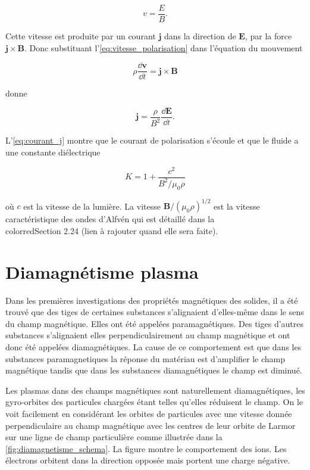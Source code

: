 \documentclass[main.tex]{subfiles}
\begin{document}
\begin{equation}
	v = \frac{E}{B}.
	\label{eq:vitesse_polarisation}
\end{equation}

\noindent Cette vitesse est produite par un courant \( \bm{j} \) dans la direction de \( \bm{E} \), par la force \( \bm{j} \times \bm{B} \).
Donc substituant l'\autoref{eq:vitesse_polarisation} dans l'équation du mouvement

\[
	\rho \frac{\dd \bm{v}}{\dd t} = \bm{j} \times \bm{B}
\]

\noindent donne

\begin{equation}
	\bm{j} = \frac{\rho}{B^2} \frac{\dd \bm{E}}{\dd t}.
	\label{eq:courant_j}
\end{equation}

L'\autoref{eq:courant_j} montre que le courant de polarisation s'écoule et que le fluide a une constante diélectrique

\[
	K = 1 + \frac{c^2}{B^2 / \mu_0 \rho}
\]

\noindent où \( c \) est la vitesse de la lumière.
La vitesse \( \bm{B} / \left( \mu_0 \rho \right)^{1/2} \) est la vitesse caractéristique des ondes d'Alfvén qui est détaillé dans la \\color{red}{Section 2.24 (lien à rajouter quand elle sera faite)}\color{black}.

\FloatBarrier
\section{Diamagnétisme plasma}

Dans les premières investigations des propriétés magnétiques des solides, il a été trouvé que des tiges de certaines substances s'alignaient d'elles-même dans le sens du champ magnétique.
Elles ont été appelées paramagnétiques.
Des tiges d'autres substances s'alignaient elles perpendiculairement au champ magnétique et ont donc été appelées diamagnétiques.
La cause de ce comportement est que dans les substances paramagnetiques la réponse du matériau est d'amplifier le champ magnétique tandis que dans les substances diamagnétiques le champ est diminué.

Les plasmas dans des champs magnétiques sont naturellement diamagnétiques, les gyro-orbites des particules chargées étant telles qu'elles réduisent le champ.
On le voit facilement en considérant les orbites de particules avec une vitesse donnée perpendiculaire au champ magnétique avec les centres de leur orbite de Larmor sur une ligne de champ particulière comme illustrée dans la \autoref{fig:diamagnetisme_schema}.
La figure montre le comportement des ions.
Les électrons orbitent dans la direction opposée mais portent une charge négative.
\end{document}
